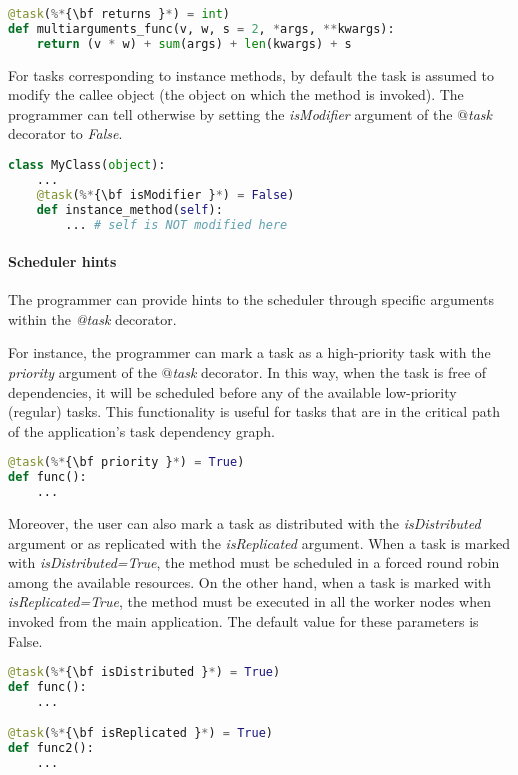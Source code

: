 \begin{lstlisting}[language=python]
@task(%*{\bf returns }*) = int)
def multiarguments_func(v, w, s = 2, *args, **kwargs):
    return (v * w) + sum(args) + len(kwargs) + s
\end{lstlisting}

For tasks corresponding to instance methods, by default the task is assumed to modify the callee object 
(the object on which the method is invoked). The programmer can tell otherwise by setting the 
{\it isModifier} argument of the {\it $@$task} decorator to {\it False}.

\begin{lstlisting}[language=python]
class MyClass(object):
    ...
    @task(%*{\bf isModifier }*) = False)
    def instance_method(self):
        ... # self is NOT modified here
\end{lstlisting}

\paragraph{Scheduler hints}

The programmer can provide hints to the scheduler through specific arguments within the {\it @task} decorator.

For instance, the programmer can mark a task as a high-priority task with the {\it priority} argument of the 
{\it $@$task} decorator. In this way, when the task is free of dependencies, it will be scheduled before 
any of the available low-priority (regular) tasks. This functionality is useful for tasks that are in 
the critical path of the application’s task dependency graph.

\begin{lstlisting}[language=python]
@task(%*{\bf priority }*) = True)
def func():
    ...
\end{lstlisting}

Moreover, the user can also mark a task as distributed with the {\it isDistributed} argument or as 
replicated with the {\it isReplicated} argument. When a task is marked with {\it isDistributed=True}, 
the method must be scheduled in a forced round robin among the available resources.
On the other hand, when a task is marked with {\it isReplicated=True}, the method must be executed in 
all the worker nodes when invoked from the main application.
The default value for these parameters is False.

\begin{lstlisting}[language=python]
@task(%*{\bf isDistributed }*) = True)
def func():
    ...

@task(%*{\bf isReplicated }*) = True)
def func2():
    ...
\end{lstlisting}

